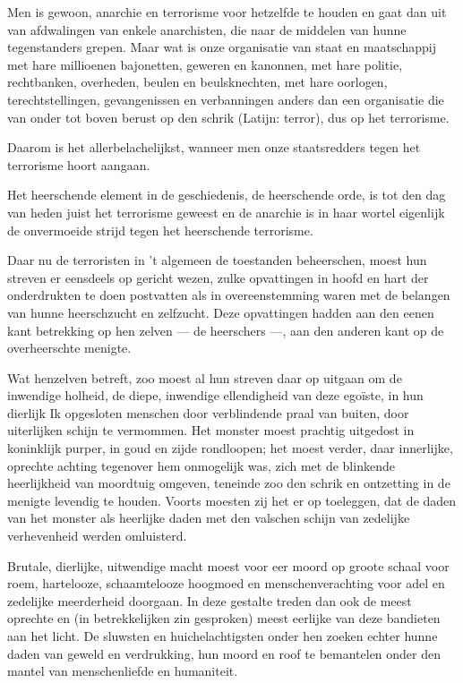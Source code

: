 \documentclass[a4paper, 12pt, oneside, dutch]{article}
\begin{document}
Men is gewoon, anarchie en terrorisme voor hetzelfde te houden en gaat dan uit van afdwalingen van enkele anarchisten, die naar de middelen van hunne tegenstanders grepen. Maar wat is onze organisatie van staat en maatschappij met hare millioenen bajonetten, geweren en kanonnen, met hare politie, rechtbanken, overheden, beulen en beulsknechten, met hare oorlogen, terechtstellingen, gevangenissen en verbanningen anders dan een organisatie die van onder tot boven berust op den schrik (Latijn: terror), dus op het terrorisme.

Daarom is het allerbelachelijkst, wanneer men onze staatsredders tegen het terrorisme hoort aangaan.

Het heerschende element in de geschiedenis, de heerschende orde, is tot den dag van heden juist het terrorisme geweest en de anarchie is in haar wortel eigenlijk de onvermoeide strijd tegen het heerschende terrorisme.

Daar nu de terroristen in 't algemeen de toestanden beheerschen, moest hun streven er eensdeels op gericht wezen, zulke opvattingen in hoofd en hart der onderdrukten te doen postvatten als in overeenstemming waren met de belangen van hunne heerschzucht en zelfzucht. Deze opvattingen hadden aan den eenen kant betrekking op hen zelven --- de heerschers ---, aan den anderen kant op de overheerschte menigte.

Wat henzelven betreft, zoo moest al hun streven daar op uitgaan om de inwendige holheid, de diepe, inwendige ellendigheid van deze egoïste, in hun dierlijk Ik opgesloten menschen door verblindende praal van buiten, door uiterlijken schijn te vermommen. Het monster moest prachtig uitgedost in koninklijk purper, in goud en zijde rondloopen; het moest verder, daar innerlijke, oprechte achting tegenover hem onmogelijk was, zich met de blinkende heerlijkheid van moordtuig omgeven, teneinde zoo den schrik en ontzetting in de menigte levendig te houden. Voorts moesten zij het er op toeleggen, dat de daden van het monster als heerlijke daden met den valschen schijn van zedelijke verhevenheid werden omluisterd.

Brutale, dierlijke, uitwendige macht moest voor eer moord op groote schaal voor roem, hartelooze, schaamtelooze hoogmoed en menschenverachting voor adel en zedelijke meerderheid doorgaan. In deze gestalte treden dan ook de meest oprechte en (in betrekkelijken zin gesproken) meest eerlijke van deze bandieten aan het licht. De sluwsten en huichelachtigsten onder hen zoeken echter hunne daden van geweld en verdrukking, hun moord en roof te bemantelen onder den mantel van menschenliefde en humaniteit.
\end{document}
